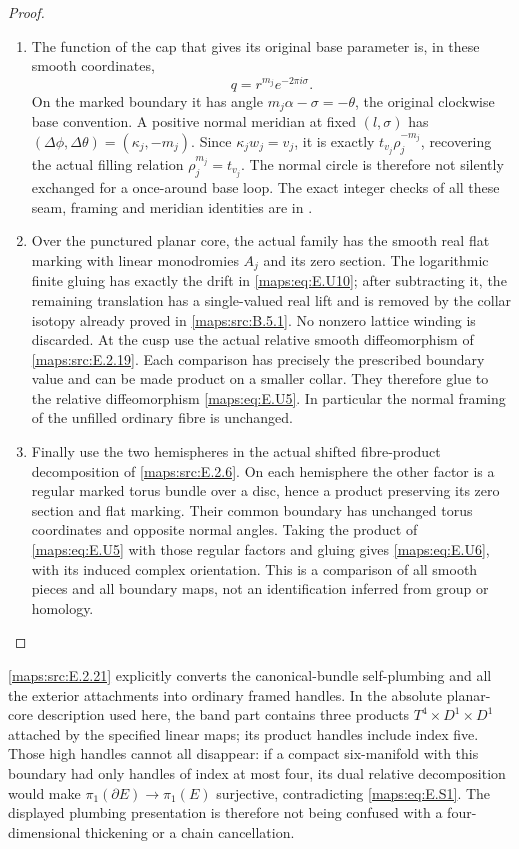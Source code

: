 \begin{proof}
\begin{enumerate}[label=\arabic*.,leftmargin=*]
\item The function of the cap that gives its original base parameter
is, in these smooth coordinates,
\[
                         q=r^{m_j}e^{-2\pi i\sigma}.
 \tag{E.U11}\label{maps:eq:E.U11}
\]
On the marked boundary it has angle
$m_j\alpha-\sigma=-\theta$, the original clockwise base
convention.  A positive normal meridian at fixed
$(l,\sigma)$ has $(\Delta\phi,\Delta\theta)=(\kappa_j,-m_j)$.
Since $\kappa_jw_j=v_j$, it is exactly $t_{v_j}\rho_j^{-m_j}$,
recovering the actual filling relation
$\rho_j^{m_j}=t_{v_j}$.  The normal circle is therefore not
silently exchanged for a once-around base loop.  The exact
integer checks of all these seam, framing and meridian
identities are in .

\item Over the punctured planar core, the actual family has the
smooth real flat marking with linear monodromies $A_j$ and
its zero section.  The logarithmic finite gluing has exactly
the drift in \eqref{maps:eq:E.U10}; after subtracting it, the remaining
translation has a single-valued real lift and is removed by
the collar isotopy already proved in \ref{maps:src:B.5.1}.  No nonzero
lattice winding is discarded.  At the cusp use the actual
relative smooth diffeomorphism of \ref{maps:src:E.2.19}.  Each comparison
has precisely the prescribed boundary value and can be
made product on a smaller collar.  They therefore glue to
the relative diffeomorphism \eqref{maps:eq:E.U5}.  In particular the
normal framing of the unfilled ordinary fibre is unchanged.

\item Finally use the two hemispheres in the actual shifted
fibre-product decomposition of \ref{maps:src:E.2.6}.  On each hemisphere
the other factor is a regular marked torus bundle over a
disc, hence a product preserving its zero section and flat
marking.  Their common boundary has unchanged torus
coordinates and opposite normal angles.  Taking the product
of \eqref{maps:eq:E.U5} with those regular factors and gluing gives
\eqref{maps:eq:E.U6}, with its induced complex orientation.  This is a
comparison of all smooth pieces and all boundary maps,
not an identification inferred from group or homology.
\end{enumerate}
\end{proof}

\ref{maps:src:E.2.21} explicitly converts the canonical-bundle self-plumbing and
all the exterior attachments into ordinary framed handles.
In the absolute planar-core description used here, the band part
contains three products
$T^4\times D^1\times D^1$ attached by the specified linear maps;
its product handles include index five.  Those high handles
cannot all disappear: if a compact six-manifold with this boundary
had only handles of index at most four, its dual relative
decomposition would make $\pi_1(\partial E)\to\pi_1(E)$ surjective,
contradicting \eqref{maps:eq:E.S1}.  The displayed plumbing presentation is
therefore not being confused with a four-dimensional thickening
or a chain cancellation.


